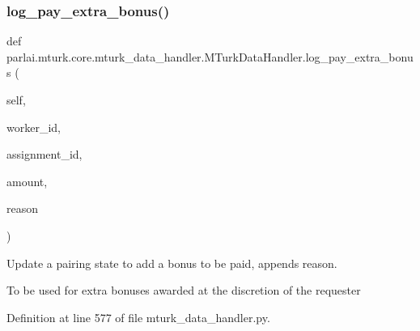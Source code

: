 \subsubsection{\texorpdfstring{log\+\_\+pay\+\_\+extra\+\_\+bonus()}{log\_pay\_extra\_bonus()}}
{\footnotesize\ttfamily def parlai.\+mturk.\+core.\+mturk\+\_\+data\+\_\+handler.\+M\+Turk\+Data\+Handler.\+log\+\_\+pay\+\_\+extra\+\_\+bonus (\begin{DoxyParamCaption}\item[{}]{self,  }\item[{}]{worker\+\_\+id,  }\item[{}]{assignment\+\_\+id,  }\item[{}]{amount,  }\item[{}]{reason }\end{DoxyParamCaption})}

\begin{DoxyVerb}Update a pairing state to add a bonus to be paid, appends reason.

To be used for extra bonuses awarded at the discretion of the requester
\end{DoxyVerb}
 

Definition at line 577 of file mturk\+\_\+data\+\_\+handler.\+py.


